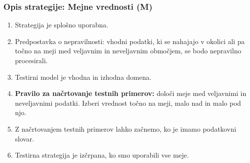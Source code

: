 \documentclass[a4paper,12pt]{article}
\begin{document}
		\subsubsection{Opis strategije: Mejne vrednosti (M)}
				
			\begin{enumerate}
			  		\item Strategija je splošno uporabna.
					\item Predpostavka o nepravilnosti: vhodni podatki, ki se nahajajo v okolici 
						  ali pa točno na meji med veljavnim in neveljavnim območjem, se bodo nepravilno procesirali.
					\item Testirni model je vhodna in izhodna domena.
					\item \textbf{Pravilo za načrtovanje testnih primerov:} določi meje med veljavnimi in neveljavnimi 
						  podatki. Izberi vrednost točno na meji, malo nad in malo pod njo.
					\item Z načrtovanjem testnih primerov lahko začnemo, ko je imamo podatkovni slovar.
					\item Testirna strategija je izčrpana, ko smo uporabili vse meje.	
			\end{enumerate}
\end{document}
